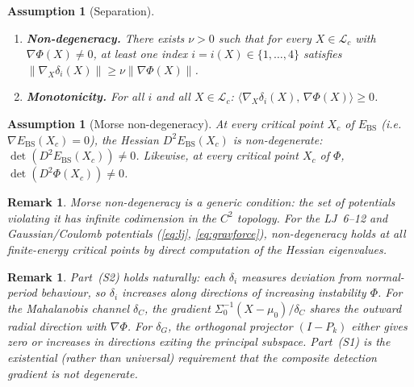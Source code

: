 \documentclass[final]{siamltex}
\newcommand{\norm}[1]{\lVert #1 \rVert}
\newcommand{\inner}[2]{\langle #1,\, #2 \rangle}
\providecommand{\grad}{\nabla}
\newcommand{\Ebs}{E_{\mathrm{BS}}}
\newtheorem{assumption}[theorem]{Assumption}
\newtheorem{remark}[theorem]{Remark}
\begin{document}
\begin{assumption}[Separation]\label{ass:sep}
\begin{enumerate}
\item[\textup{(S1)}] \textbf{Non-degeneracy.}
  There exists $\nu>0$ such that for every $X\in\mathcal{L}_c$
  with $\grad\Phi(X)\neq 0$, at least one index
  $i=i(X)\in\{1,\ldots,4\}$ satisfies
  $\norm{\grad_X\delta_i(X)}\ge\nu\norm{\grad\Phi(X)}$.
\item[\textup{(S2)}] \textbf{Monotonicity.}
  For all $i$ and all $X\in\mathcal{L}_c$:
  $\inner{\grad_X\delta_i(X)}{\grad\Phi(X)}\ge 0$.
\end{enumerate}
\end{assumption}

\begin{assumption}[Morse non-degeneracy]\label{ass:morse}
At every critical point $X_c$ of $\Ebs$ (i.e.\ $\grad\Ebs(X_c)=0$),
the Hessian $D^2\Ebs(X_c)$ is non-degenerate:
$\det(D^2\Ebs(X_c))\neq 0$.  Likewise, at every critical point
$X_c$ of $\Phi$, $\det(D^2\Phi(X_c))\neq 0$.
\end{assumption}

\begin{remark}\label{rem:morse_generic}
Morse non-degeneracy is a generic condition: the set of potentials
violating it has infinite codimension in the $C^2$ topology.  For
the LJ~6--12 and Gaussian/Coulomb potentials
(\eqref{eq:lj}, \eqref{eq:gravforce}), non-degeneracy holds at
all finite-energy critical points by direct computation of the
Hessian eigenvalues.
\end{remark}

\begin{remark}\label{rem:monotonicity}
Part~(S2) holds naturally: each $\delta_i$ measures deviation from
normal-period behaviour, so $\delta_i$ increases along directions
of increasing instability $\Phi$.  For the Mahalanobis channel
$\delta_C$, the gradient $\Sigma_0^{-1}(X{-}\mu_0)/\delta_C$
shares the outward radial direction with $\grad\Phi$.  For
$\delta_G$, the orthogonal projector $(I{-}P_k)$ either gives zero
or increases in directions exiting the principal subspace.
Part~(S1) is the existential (rather than universal) requirement
that the \emph{composite} detection gradient is not degenerate.
\end{remark}
\end{document}
